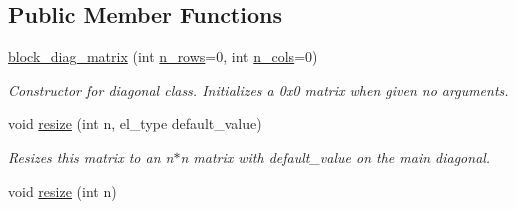 \subsection*{Public Member Functions}
\begin{DoxyCompactItemize}
\item 
\hyperlink{classblock__diag__matrix_a1591d461af4469b500f856745ed2d05b}{block\+\_\+diag\+\_\+matrix} (int \hyperlink{classblock__diag__matrix_a7d965a63398622c241a1b28b41cd9d18}{n\+\_\+rows}=0, int \hyperlink{classblock__diag__matrix_a09c9b0481acb773a864fa9f320f76cc7}{n\+\_\+cols}=0)\hypertarget{classblock__diag__matrix_a1591d461af4469b500f856745ed2d05b}{}\label{classblock__diag__matrix_a1591d461af4469b500f856745ed2d05b}

\begin{DoxyCompactList}\small\item\em Constructor for diagonal class. Initializes a 0x0 matrix when given no arguments. \end{DoxyCompactList}\item 
void \hyperlink{classblock__diag__matrix_aa2f3ffb9d4e198ab18262b702c79cadb}{resize} (int n, el\+\_\+type default\+\_\+value)\hypertarget{classblock__diag__matrix_aa2f3ffb9d4e198ab18262b702c79cadb}{}\label{classblock__diag__matrix_aa2f3ffb9d4e198ab18262b702c79cadb}

\begin{DoxyCompactList}\small\item\em Resizes this matrix to an n$\ast$n matrix with default\+\_\+value on the main diagonal. \end{DoxyCompactList}\item 
void \hyperlink{classblock__diag__matrix_a12249531555506377724ff14abec6905}{resize} (int n)\hypertarget{classblock__diag__matrix_a12249531555506377724ff14abec6905}{}\label{classblock__diag__matrix_a12249531555506377724ff14abec6905}


\end{DoxyCompactItemize}
